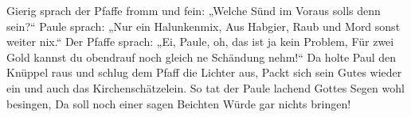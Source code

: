 \begin{guitar}
	 
	
	Gierig sprach der Pfaffe fromm und fein:
	„Welche Sünd im Voraus solls denn sein?“
	Paule sprach: „Nur ein Halunkenmix,
	Aus Habgier, Raub und Mord sonst weiter nix.“
	Der Pfaffe sprach: „Ei, Paule, oh, das ist ja kein Problem,
	Für zwei Gold kannst du obendrauf noch gleich ne Schändung nehm!“
	Da holte Paul den Knüppel raus und schlug dem Pfaff die Lichter aus,
	Packt sich sein Gutes wieder ein und auch das Kirchenschätzelein.
	So tat der Paule lachend Gottes
	Segen wohl besingen,
	Da soll noch einer sagen Beichten 
	Würde gar nichts bringen!
	
	 
	
\end{guitar}